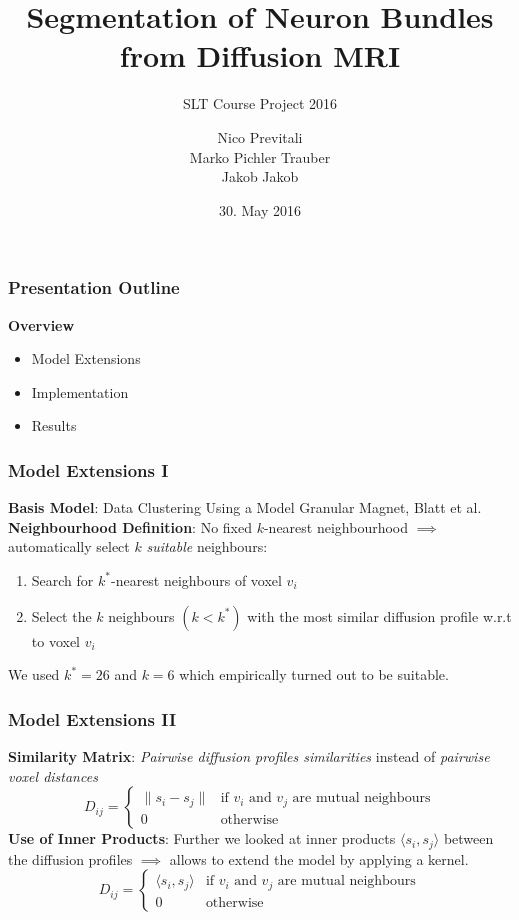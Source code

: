 \documentclass{beamer}
\title{\textbf{Segmentation of Neuron Bundles from Diffusion MRI}}
\subtitle{SLT Course Project 2016}
\author{ Nico Previtali \\ Marko Pichler Trauber \\ Jakob Jakob}
\date{30. May 2016}
\institute[ETH Zürich]
\begin{document}
\begin{frame}
 \titlepage
\end{frame}


\begin{frame}
\frametitle{Presentation Outline}
\textbf{Overview} \newline
\begin{itemize}
	\item Model Extensions
	\item Implementation
	\item Results
\end{itemize}
\end{frame}

\begin{frame}
\frametitle{Model Extensions I}
\textbf{Basis Model}: Data Clustering Using a Model Granular Magnet, Blatt et al. \cite{blatt1997data} \newline\newline
\textbf{Neighbourhood Definition}: No fixed $k$-nearest neighbourhood $\implies$ automatically select $k$ \emph{suitable} neighbours:
\linebreak
\begin{enumerate}
	\item Search for $k^*$-nearest neighbours of voxel $v_i$
	\item Select the $k$ neighbours $(k < k^*)$ with the most similar diffusion profile w.r.t to voxel $v_i$\linebreak
\end{enumerate}
We used $k^* = 26$ and $k = 6$ which empirically turned out to be suitable.
\end{frame}


\begin{frame}
\frametitle{Model Extensions II}
\textbf{Similarity Matrix}: \emph{Pairwise diffusion profiles similarities} instead of \emph{pairwise voxel distances}
\begin{equation*} 
	D_{ij} = 
	\begin{cases}
		\lVert s_i - s_j \rVert & \text{if $v_i$ and $v_j$ are mutual neighbours} \\
		0 & \text{otherwise}
	\end{cases}
\end{equation*}
\textbf{Use of Inner Products}: Further we looked at inner products $\langle s_i, s_j \rangle$ between the diffusion profiles $\implies$ allows to extend the model by applying a kernel. 
\begin{equation*} 
	D_{ij} = 
	\begin{cases}
		\langle s_i, s_j \rangle & \text{if $v_i$ and $v_j$ are mutual neighbours} \\
		0 & \text{otherwise}
	\end{cases}
\end{equation*}
\end{frame}
\end{document}
